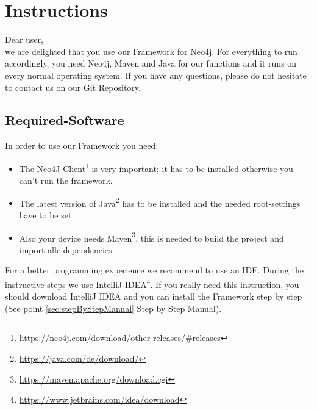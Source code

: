 \chapter{Instructions}\label{chap:zielbestimmung}
Dear user,\\
we are delighted that you use our Framework for Neo4j. For everything to run accordingly, you need Neo4j, Maven and Java for our functions and it runs on every normal operating system.
If you have any questions, please do not hesitate to contact us on our \glqq Git Repository\grqq{}.

\section{Required-Software}\label{sec:neededsoftware}
In order to use our Framework you need:
\begin{itemize}
	\item The Neo4J Client\footnote{\url{https://neo4j.com/download/other-releases/\#releases}} is very important; it has to be installed otherwise you can't run the framework.
	\item The latest version of Java\footnote{\url{https://java.com/de/download/}} has to be installed and the needed root-settings have to be set.
	\item Also your device needs Maven\footnote{\url{https://maven.apache.org/download.cgi}}, this is needed to build the project and import alle dependencies{}.
\end{itemize}
For a better programming experience we recommend to use an IDE. During the instructive steps we use IntelliJ IDEA\footnote{\url{https://www.jetbrains.com/idea/download}}. If you really need this instruction, you should download IntelliJ IDEA and you can install the Framework step by step (See point \ref{sec:stepByStepManual} Step by Step Manual).

\newpage


